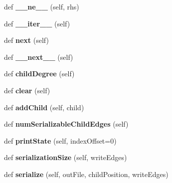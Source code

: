 \begin{DoxyCompactItemize}
def {\bfseries \+\_\+\+\_\+ne\+\_\+\+\_\+} (self, rhs)
\item 
\mbox{\label{classinfomap_1_1LeafIterator_ab018108f672c7c3317f3cefe0f614ce7}} 
def {\bfseries \+\_\+\+\_\+iter\+\_\+\+\_\+} (self)
\item 
\mbox{\label{classinfomap_1_1LeafIterator_a3bd0810adfed4fb88fc07ab35e44ae74}} 
def {\bfseries next} (self)
\item 
\mbox{\label{classinfomap_1_1LeafIterator_a23cacb8615646c361cc06658f25dc437}} 
def {\bfseries \+\_\+\+\_\+next\+\_\+\+\_\+} (self)
\item 
\mbox{\label{classinfomap_1_1LeafIterator_a769e432d422a7c2eaf705e296f8bf1a3}} 
def {\bfseries child\+Degree} (self)
\item 
\mbox{\label{classinfomap_1_1LeafIterator_a8a7f311c22693edf97822507b1889ad8}} 
def {\bfseries clear} (self)
\item 
\mbox{\label{classinfomap_1_1LeafIterator_a38a9e6e3f7728bec7d5a51b94759b9b9}} 
def {\bfseries add\+Child} (self, child)
\item 
\mbox{\label{classinfomap_1_1LeafIterator_a0236e1de114a0391b8c26a17ecc1fa5a}} 
def {\bfseries num\+Serializable\+Child\+Edges} (self)
\item 
\mbox{\label{classinfomap_1_1LeafIterator_a8adefa0d4ddccbf002cd1e2225335a72}} 
def {\bfseries print\+State} (self, index\+Offset=0)
\item 
\mbox{\label{classinfomap_1_1LeafIterator_a4b454b6e3a2b065abe41e3ecc1fa41b5}} 
def {\bfseries serialization\+Size} (self, write\+Edges)
\item 
\mbox{\label{classinfomap_1_1LeafIterator_a05cf80e67362fffbb5549d0f71b200f0}} 
def {\bfseries serialize} (self, out\+File, child\+Position, write\+Edges)
\item 

\end{DoxyCompactItemize}
